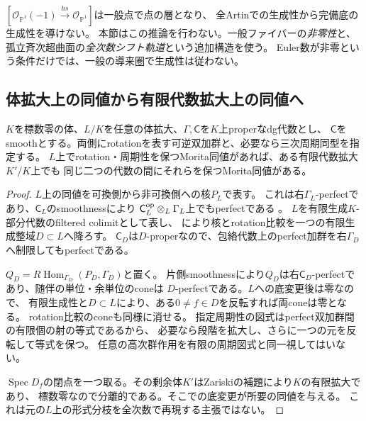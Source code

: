 \begin{remark}[既存の反例との相違]
$[\mathcal O_{\mathbb P^1}(-1)\xrightarrow{hs}\mathcal O_{\mathbb P^1}]$は一般点で点の層となり、
全Artinでの生成性から完備底の生成性を導けない。
本節はこの推論を行わない。一般ファイバーの\emph{非零性}と、
孤立斉次超曲面の\emph{全次数シフト軌道}という追加構造を使う。
Euler数が非零という条件だけでは、一般の導来圏で生成性は従わない。
\end{remark}

\subsection{体拡大上の同値から有限代数拡大上の同値へ}

\begin{lemma}[固定された可換模型へのgeneric降下]\label{rog:lem:descent}
$K$を標数零の体、$L/K$を任意の体拡大、$\Gamma,\mathsf C$を$K$上properなdg代数とし、
$\mathsf C$をsmoothとする。両側にrotationを表す可逆双加群と、必要なら三次周期同型を指定する。
$L$上でrotation・周期性を保つMorita同値があれば、ある有限代数拡大$K'/K$上でも
同じ二つの代数の間にそれらを保つMorita同値がある。
\end{lemma}
\begin{proof}
$L$上の同値を可換側から非可換側への核$P_L$で表す。
これは右$\Gamma_L$-perfectであり、$\mathsf C_L$のsmoothnessにより
$\mathsf C_L^{\rm op}\otimes_L\Gamma_L$上でもperfectである
\cite[Lemma~2.8]{ROGTV}。
$L$を有限生成$K$-部分代数のfiltered colimitとして表し、
\cite[Lemma~2.10]{ROGTV}により核とrotation比較を一つの有限生成整域$D\subset L$へ降ろす。
$\mathsf C_D$は$D$-properなので、包絡代数上のperfect加群を右$\Gamma_D$へ制限してもperfectである。

$Q_D=R\operatorname{Hom}_{\Gamma_D}(P_D,\Gamma_D)$と置く。
片側smoothnessにより$Q_D$は右$\mathsf C_D$-perfectであり、随伴の単位・余単位のconeは
$D$-perfectである。$L$への底変更後は零なので、
有限生成性と$D\subset L$により、ある$0\ne f\in D$を反転すれば両coneは零となる。
rotation比較のconeも同様に消せる。
指定周期性の図式はperfect双加群間の有限個の射の等式であるから、
必要なら段階を拡大し、さらに一つの元を反転して等式を保つ。
任意の高次群作用を有限の周期図式と同一視してはいない。

$\operatorname{Spec}D_f$の閉点を一つ取る。その剰余体$K'$はZariskiの補題により$K$の有限拡大であり、
標数零なので分離的である。そこでの底変更が所要の同値を与える。
これは元の$L$上の形式分枝を全次数で再現する主張ではない。
\end{proof}

